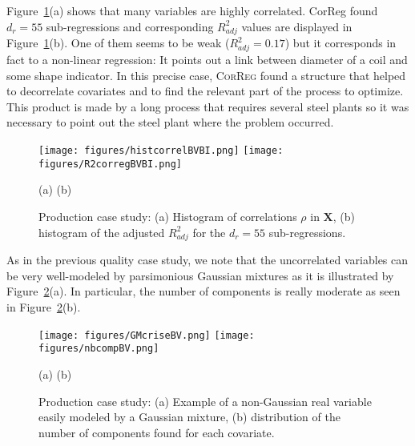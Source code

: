 \documentclass[12pt,a4paper]{report}
\begin{document}
		
		
Figure~\ref{fig:graphCorr.production}(a) shows that many variables are highly correlated. {\sc CorReg} found $d_r=55$ sub-regressions and corresponding $R_{adj}^2$ values are displayed in Figure~\ref{fig:graphCorr.production}(b). One of them seems to be weak ($R_{adj}^2=0.17$) but it corresponds in fact to a non-linear regression: It points out a link between diameter of a coil and some shape indicator. In this precise case, \textsc{CorReg} found a structure that helped to decorrelate covariates and to find the relevant part of the process to optimize. This product is made by a long process that requires several steel plants so it was necessary to point out the steel plant where the problem occurred.	
		

\begin{figure}[h!]
\begin{center}
			\texttt{[image: figures/histcorrelBVBI.png]}
			\texttt{[image: figures/R2corregBVBI.png]}
\end{center}
\vspace{-5mm}
			\centerline{(a) \hspace{130px} (b)}
			\caption{Production case study: (a) Histogram of correlations $\rho$ in $\boldsymbol{X}$, (b) histogram of the adjusted $R^2_{adj}$ for the $d_r=55$ sub-regressions.}\label{fig:graphCorr.production}
\end{figure}  	

\vspace{3mm}

As in the previous quality case study, we note that the uncorrelated variables can be very well-modeled by parsimonious Gaussian mixtures as it is illustrated by Figure~\ref{fig:graphMixmod.production}(a). In particular, the number of components is really moderate as seen in Figure~\ref{fig:graphMixmod.production}(b).

\vspace{3mm}

		\begin{figure}[h!]
\begin{center}
			\texttt{[image: figures/GMcriseBV.png]}
			\texttt{[image: figures/nbcompBV.png]}
\end{center}
\vspace{-5mm}
			\centerline{(a) \hspace{130px} (b)}
			\caption{Production case study: (a) Example of a non-Gaussian real variable easily modeled by a Gaussian mixture, (b) distribution of the number of components found for each covariate.}\label{fig:graphMixmod.production}
\end{figure}  	
\end{document}
